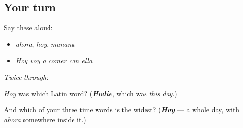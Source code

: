 \subsection*{Your turn}
Say these aloud:

\begin{itemize}
\raggedright
  \item \emph{ahora}, \emph{hoy}, \emph{mañana}
  \item \emph{Hoy voy a comer con ella}
\end{itemize}

\emph{Twice through:}

\begin{tcolorbox}[breakable,colback=teal!4,colframe=teal!35!black,title={Before you move on}]
\emph{Hoy} was which Latin word? (\emph{\textbf{Hodie}}, which was \emph{this day}.)

And which of your three time words is the widest? (\emph{\textbf{Hoy}} — a whole day, with \emph{ahora} somewhere inside it.)
\end{tcolorbox}
